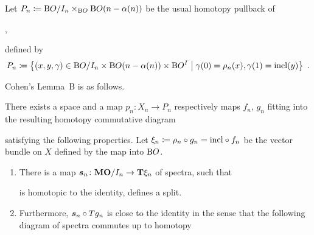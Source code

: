 \begin{Def*}
  Let $P_n\coloneqq \mathrm{B}O/I_{n} \times_{\mathrm{B}O}\mathrm{B}O(n-\alpha(n))$
  be the usual homotopy pullback of
  \begin{center}
    ,
  \end{center}
  \idest defined by
  \begin{gather*}
    P_n
    \coloneqq \left\{
      (x, y, \gamma)
      \in \mathrm{B}O/I_{n}\times \mathrm{B}O(n-\alpha(n))\times \mathrm{B}O^I
      \;\middle|\;
      \gamma(0) = \rho_n(x), \gamma(1) = \mathrm{incl}(y)
    \right\}
    \;.
  \end{gather*}
\end{Def*}
Cohen's Lemma~B is as follows.
\begin{Thm*}
  There exists a space and a map $p_n\colon X_n\to P_n$
  respectively maps $f_n$, $g_n$ fitting into the resulting
  homotopy commutative diagram
  \begin{center}
  \end{center}
  satisfying the following properties.
  Let $\xi_n\coloneqq \rho_n\circ g_n=\mathrm{incl}\circ f_n$ be the vector bundle on
  $X$ defined by the map into $\mathrm{B}O$.
  \begin{enumerate}
  \item\label{item:bomodinfactorisation:1}
    There is a map $\bm{s}_n\colon \bm{\mathrm{MO}}/I_{n}\to\bm{\mathrm{T}}{\xi_n}$ of
    spectra, such that
    \begin{center}
    \end{center}
    is homotopic to the identity, \idest defines a split.
  \item\label{item:bomodinfactorisation:2}
    Furthermore, $\bm{s}_n\circ T{g_n}$ is close to the
    identity in the sense that the following diagram of spectra
    commutes up to homotopy
    \begin{center}
    \end{center}
  \end{enumerate}
\end{Thm*}
